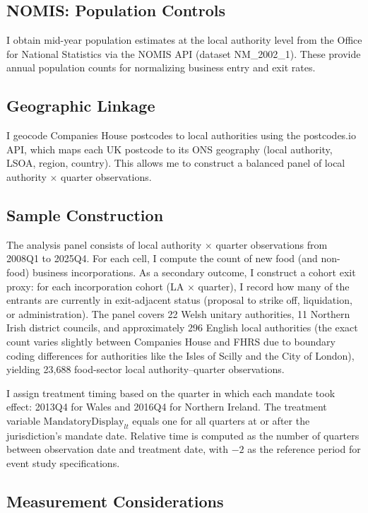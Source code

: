 \documentclass[12pt]{article}
\begin{document}
\subsection{NOMIS: Population Controls}

I obtain mid-year population estimates at the local authority level from the Office for National Statistics via the NOMIS API (dataset NM\_2002\_1). These provide annual population counts for normalizing business entry and exit rates.

\subsection{Geographic Linkage}

I geocode Companies House postcodes to local authorities using the postcodes.io API, which maps each UK postcode to its ONS geography (local authority, LSOA, region, country). This allows me to construct a balanced panel of local authority $\times$ quarter observations.

\subsection{Sample Construction}

The analysis panel consists of local authority $\times$ quarter observations from 2008Q1 to 2025Q4. For each cell, I compute the count of new food (and non-food) business incorporations. As a secondary outcome, I construct a cohort exit proxy: for each incorporation cohort (LA $\times$ quarter), I record how many of the entrants are currently in exit-adjacent status (proposal to strike off, liquidation, or administration). The panel covers 22 Welsh unitary authorities, 11 Northern Irish district councils, and approximately 296 English local authorities (the exact count varies slightly between Companies House and FHRS due to boundary coding differences for authorities like the Isles of Scilly and the City of London), yielding 23,688 food-sector local authority--quarter observations.

I assign treatment timing based on the quarter in which each mandate took effect: 2013Q4 for Wales and 2016Q4 for Northern Ireland. The treatment variable $\text{MandatoryDisplay}_{lt}$ equals one for all quarters at or after the jurisdiction's mandate date. Relative time is computed as the number of quarters between observation date and treatment date, with $-2$ as the reference period for event study specifications.

\subsection{Measurement Considerations}
\end{document}
